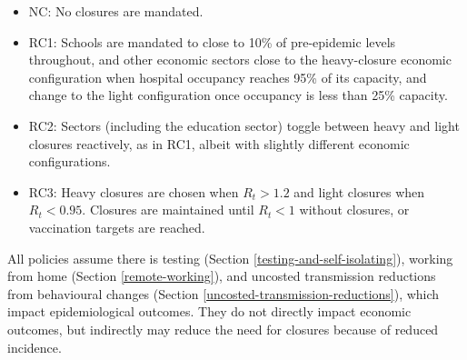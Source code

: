\documentclass[
]{article}
\providecommand{\tightlist}{%
  \setlength{\itemsep}{0pt}\setlength{\parskip}{0pt}}
\begin{document}
\begin{itemize}
\tightlist
\item
  NC: No closures are mandated.
\item
  RC1: Schools are mandated to close to 10\% of pre-epidemic levels throughout, and other economic sectors close to the heavy-closure economic configuration when hospital occupancy reaches 95\% of its capacity, and change to the light configuration once occupancy is less than 25\% capacity.
\item
  RC2: Sectors (including the education sector) toggle between heavy and light closures reactively, as in RC1, albeit with slightly different economic configurations.
\item
  RC3: Heavy closures are chosen when \(R_t>1.2\) and light closures when \(R_t<0.95\). Closures are maintained until \(R_t<1\) without closures, or vaccination targets are reached.
\end{itemize}

All policies assume there is testing (Section \ref{testing-and-self-isolating}), working from home (Section \ref{remote-working}), and uncosted transmission reductions from behavioural changes (Section \ref{uncosted-transmission-reductions}), which impact epidemiological outcomes. They do not directly impact economic outcomes, but indirectly may reduce the need for closures because of reduced incidence.
\end{document}
